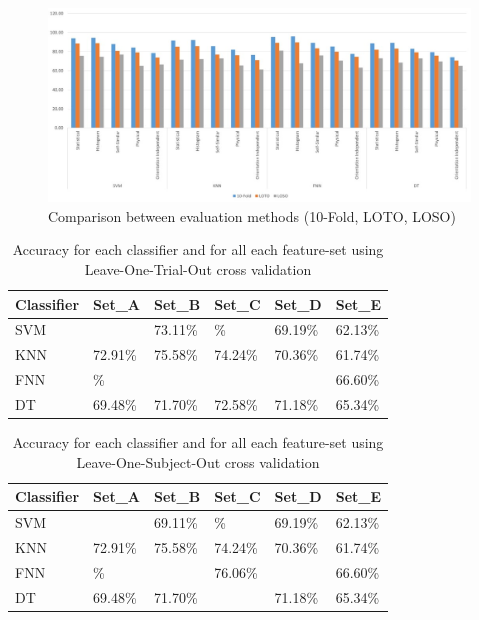 \documentclass[journal,article,submit,moreauthors,pdftex]{Definitions/mdpi}
\begin{document}
 
\begin{figure}[H]
	\centering
	\includegraphics[width=14 cm]{Definitions/images/evaluation_comparison_2.jpg}
	\caption{Comparison between evaluation methods (10-Fold, LOTO, LOSO)}
	\label{fig:evaluation_comparison}
\end{figure} 

\begin{table}[H]
	\caption{Accuracy for each classifier and for all each feature-set using Leave-One-Trial-Out cross validation }
	\centering
	\begin{tabular}{p{3cm}p{2cm}p{2cm}p{2cm}p{2cm}p{2cm}}
		\toprule
		\textbf{Classifier} & \textbf{Set\_A} & \textbf{Set\_B} & \textbf{Set\_C} & \textbf{Set\_D} & \textbf{Set\_E} \\
		\midrule	
		SVM &  \cellcolor{gray!35}{76.73\%} & 73.11\% & \cellcolor{gray!35}{76.70}\% &69.19\% & 62.13\% \\
		KNN & 72.91\% & 75.58\% & 74.24\% &70.36\% & 61.74\% \\
		FNN & \cellcolor{gray!35}{77.07}\% & \cellcolor{gray!35}{79.87\%} &  \cellcolor{gray!35}{76.06\%} &\cellcolor{gray!35}{73.04\%} & 66.60\% \\
		DT & 69.48\% & 71.70\% & 72.58\% &71.18\% & 65.34\% \\
		\bottomrule
	\end{tabular}
	\label{Table:LOTO_results}
\end{table}

\begin{table}[H]
	\caption{Accuracy for each classifier and for all each feature-set using Leave-One-Subject-Out cross validation }
	\centering
	\begin{tabular}{p{3cm}p{2cm}p{2cm}p{2cm}p{2cm}p{2cm}}
		\toprule
		\textbf{Classifier} & \textbf{Set\_A} & \textbf{Set\_B} & \textbf{Set\_C} & \textbf{Set\_D} & \textbf{Set\_E} \\
		\midrule	
		SVM &  \cellcolor{gray!35}{68.83\%} & 69.11\% & \cellcolor{gray!35}{76.70}\% &69.19\% & 62.13\% \\
		KNN & 72.91\% & 75.58\% & 74.24\% &70.36\% & 61.74\% \\
		FNN & \cellcolor{gray!35}{77.07}\% & \cellcolor{gray!35}{79.87\%} & 76.06\% &\cellcolor{gray!35}{73.04\%} & 66.60\% \\
		DT & 69.48\% & 71.70\% &  \cellcolor{gray!35}{72.58\%} &71.18\% & 65.34\% \\
		\bottomrule
	\end{tabular}
	\label{Table:LOSO_results}
\end{table}
\end{document}
